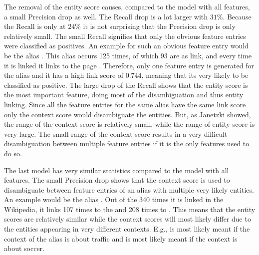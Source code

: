 The removal of the entity score causes, compared to the model with all features, a small Precision drop as well. The Recall drop is a lot larger with $31\%$. Because the Recall is only at $24\%$ it is not surprising that the Precision drop is only relatively small. The small Recall signifies that only the obvious feature entries were classified as positives. An example for such an obvious feature entry would be the alias . This alias occurs 125 times, of which 93 are as link, and every time it is linked it links to the page . Therefore, only one feature entry is generated for the alias and it has a high link score of $0.744$, meaning that its very likely to be classified as positive. The large drop of the Recall shows that the entity score is the most important feature, doing most of the disambiguation and thus entity linking. Since all the feature entries for the same alias have the same link score only the context score would disambiguate the entities. But, as Janetzki \cite{janetzki} showed, the range of the context score is relatively small, while the range of entity score is very large. The small range of the context score results in a very difficult disambiguation between multiple feature entries if it is the only features used to do so.\par
The last model has very similar statistics compared to the model with all features. The small Precision drop shows that the context score is used to disambiguate between feature entries of an alias with multiple very likely entities. An example would be the alias . Out of the 340 times it is linked in the Wikipedia, it links 107 times to the  and 208 times to . This means that the entity scores are relatively similar while the context scores will most likely differ due to the entities appearing in very different contexts. E.g.,  is most likely meant if the context of the alias is about traffic and  is most likely meant if the context is about soccer.\par

